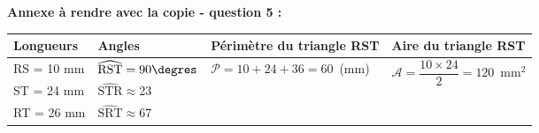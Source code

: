 \vspace{0,5cm}

\textbf{Annexe à rendre avec la copie - question 5 :}

\medskip

\begin{tabularx}{\linewidth}{|*{4}{>{}X|}} \hline
\textbf{Longueurs} & \textbf{Angles} & \textbf{Périmètre du triangle RST} & \textbf{Aire du triangle RST}\\ \hline
	
\rule[-3mm]{0mm}{10mm}RS = 10 mm & $\widehat{\mathrm{RST}} = 90\degres$ & \multirow{3}{*}{\rule{0mm}{12mm}$ \mathcal{P} = 10 + 24 + 36 = 60$~(mm)}
	& \multirow{3}{*}{\rule{0mm}{12mm}$ \mathcal{A} = \dfrac{10 \times 24}{2} = 120$~mm$^2$}
	\\ \cline{1-2}
	\rule[-3mm]{0mm}{10mm}ST = 24 mm & $\widehat{\mathrm{STR}} \approx $23\degres&&\\ \cline{1-2}
	\rule[-3mm]{0mm}{10mm}RT = 26 mm & $\widehat{\mathrm{SRT}} \approx $67\degres&&\\ \hline
	
\end{tabularx}


